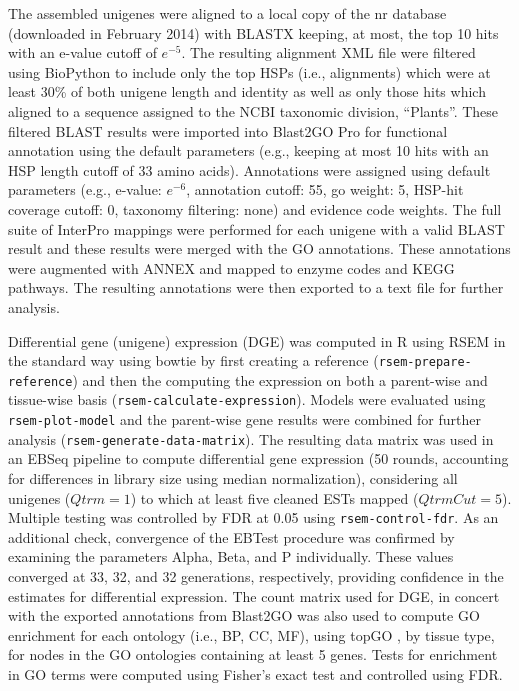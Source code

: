 \documentclass[11pt]{article}
\begin{document}
The assembled unigenes were aligned to a local copy of the nr database
(downloaded in February 2014) with BLASTX \citep{citeulike:238188}
keeping, at most, the top 10 hits with an e-value cutoff of
$e^{-5}$. The resulting alignment XML file were filtered using
BioPython \citep[v.\ 1.6.4]{citeulike:4202607} to include only the top
HSPs (i.e., alignments) which were at least 30\% of both unigene
length and identity as well as only those hits which aligned to a
sequence assigned to the NCBI taxonomic division, ``Plants''. These
filtered BLAST results were imported into Blast2GO Pro \citep[v.\
2.7.2, bg2\_sep14]{citeulike:2733895} for functional annotation using
the default parameters (e.g., keeping at most 10 hits with an HSP
length cutoff of 33 amino acids).  Annotations were assigned using
default parameters (e.g., e-value: $e^{-6}$, annotation cutoff: 55, go
weight: 5, HSP-hit coverage cutoff: 0, taxonomy filtering: none) and
evidence code weights. The full suite of InterPro
\citep{citeulike:12942060} mappings were performed for each unigene
with a valid BLAST result and these results were merged with the GO
annotations.  These annotations were augmented with ANNEX
\citep{annex} and mapped to enzyme codes and KEGG
\citep{citeulike:9172127} pathways. The resulting annotations were
then exported to a text file for further analysis. 

Differential gene (unigene) expression (DGE) was computed in R
\citep[v. 3.1.1]{R} using RSEM
\citep[v. 1.2.15]{Li:BmcBioinformatics:2011} in the standard way using
bowtie \citep[v. 2.2.3]{Langmead:NatMethods:2012} by first creating a
reference (\texttt{rsem-prepare-reference}) and then the computing the
expression on both a parent-wise and tissue-wise basis
(\texttt{rsem-calculate-expression}). Models were evaluated using
\texttt{rsem-plot-model} and the parent-wise gene results were
combined for further analysis
(\texttt{rsem-generate-data-matrix}). The resulting data matrix was
used in an EBSeq \citep{Leng:Bioinformatics:2013} pipeline to compute
differential gene expression (50 rounds, accounting for differences in
library size using median normalization), considering all unigenes
($Qtrm=1$) to which at least five cleaned ESTs mapped
($QtrmCut=5$). Multiple testing was controlled by FDR
\citep{benjamini1995controlling} at 0.05 using
\texttt{rsem-control-fdr}.  As an additional check, convergence of the
EBTest procedure was confirmed by examining the parameters Alpha,
Beta, and P individually.  These values converged at 33, 32, and 32
generations, respectively, providing confidence in the estimates for
differential expression. The count matrix used for DGE, in concert
with the exported annotations from Blast2GO was also used to compute
GO enrichment for each ontology (i.e., BP, CC, MF), using topGO
\citep{topgo}, by tissue type, for nodes in the GO ontologies
containing at least 5 genes.  Tests for enrichment in GO terms 
were computed using Fisher's exact test and controlled using FDR.
\end{document}
